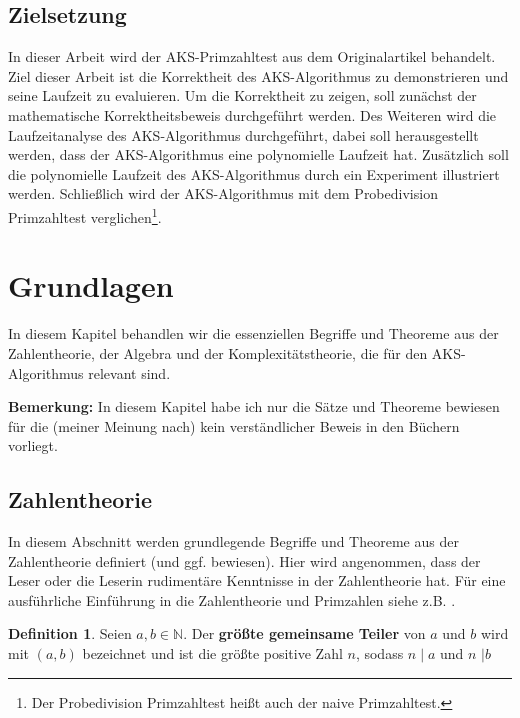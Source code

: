 \documentclass[12pt,oneside]{article}
\theoremstyle{remark}
\theoremstyle{definition}
\newtheorem{definition}{Definition}[section]
\begin{document}
\subsection{Zielsetzung}
In dieser Arbeit wird der AKS-Primzahltest aus dem Originalartikel\cite{aks} behandelt. Ziel dieser Arbeit ist die Korrektheit des AKS-Algorithmus zu demonstrieren und seine Laufzeit zu evaluieren. Um die Korrektheit zu zeigen, soll zunächst der mathematische Korrektheitsbeweis durchgeführt werden. Des Weiteren wird die Laufzeitanalyse des AKS-Algorithmus durchgeführt, dabei soll herausgestellt werden, dass der AKS-Algorithmus eine polynomielle Laufzeit hat. Zusätzlich soll die polynomielle Laufzeit des AKS-Algorithmus durch ein Experiment illustriert werden. Schließlich wird der AKS-Algorithmus mit dem Probedivision Primzahltest verglichen\footnote{Der Probedivision Primzahltest heißt auch der naive Primzahltest.}.


\newpage


\section{Grundlagen}
In diesem Kapitel behandlen wir die essenziellen Begriffe und Theoreme aus der Zahlentheorie, der Algebra und der Komplexitätstheorie, die für den AKS-Algorithmus relevant sind.

\smallskip

\textbf{\small{Bemerkung:}} In diesem Kapitel habe ich nur die Sätze und Theoreme bewiesen für die (meiner Meinung nach) kein verständlicher Beweis in den Büchern vorliegt.\newline


\subsection{Zahlentheorie}
In diesem Abschnitt werden grundlegende Begriffe und Theoreme aus der Zahlentheorie definiert (und ggf. bewiesen). Hier wird angenommen, dass der Leser oder die Leserin rudimentäre Kenntnisse in der Zahlentheorie hat. Für eine ausführliche Einführung in die Zahlentheorie und Primzahlen siehe z.B.  \cite{prime-numbers}.


\theoremstyle{definition}
\begin{definition}\label{Df_1}
Seien $a,b \in \mathbb{N}$. Der \textbf{größte gemeinsame Teiler} von $a$ und $b$ wird mit $(a,b)$ bezeichnet und ist die größte positive Zahl $n$, sodass $n \mid a$ und $n$ $ \mid b$
\end{definition}
\end{document}
